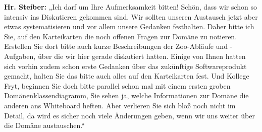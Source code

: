 \textbf{Hr. Steiber:} „Ich darf um Ihre Aufmerksamkeit bitten! Schön, dass wir schon so intensiv ins Diskutieren gekommen sind. Wir sollten unseren Austausch jetzt aber etwas systematisieren und vor allem unsere Gedanken festhalten. Daher bitte ich Sie, auf den Karteikarten die noch offenen Fragen zur Domäne zu notieren. Erstellen Sie dort bitte auch kurze Beschreibungen der Zoo-Abläufe und -Aufgaben, über die wir hier gerade diskutiert hatten. Einige von Ihnen hatten sich vorhin zudem schon erste Gedanken über das zukünftige Softwareprodukt gemacht, halten Sie das bitte auch alles auf den Karteikarten fest. Und Kollege Fryt, beginnen Sie doch bitte parallel schon mal mit einem ersten groben Domänenklassendiagramm, Sie sehen ja, welche Informationen zur Domäne die anderen ans Whiteboard heften. Aber verlieren Sie sich bloß noch nicht im Detail, da wird es sicher noch viele Änderungen geben, wenn wir uns weiter über die Domäne austauschen.“




